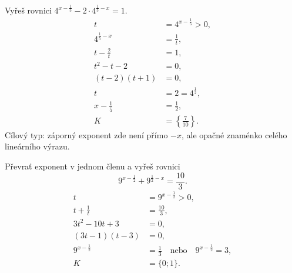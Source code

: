 \documentclass[11pt,a4paper]{article}
\begin{document}
\begin{prikladReseniBox}[title={Příklad 4}]
Vyřeš rovnici $4^{x-\frac{1}{5}}-2\cdot4^{\frac{1}{5}-x}=1$.
\tcblower
\[
\begin{aligned}t&=4^{x-\frac{1}{5}}>0,\\4^{\frac{1}{5}-x}&=\frac{1}{t},\\t-\frac{2}{t}&=1,\\t^2-t-2&=0,\\(t-2)(t+1)&=0,\\t&=2=4^{\frac{1}{2}},\\x-\frac{1}{5}&=\frac{1}{2},\\K&=\left\{\frac{7}{10}\right\}.\end{aligned}
\]
Cílový typ: záporný exponent zde není přímo $-x$, ale opačné znaménko celého lineárního výrazu.
\end{prikladReseniBox}
\begin{prikladReseniBox}[title={Příklad 5}]
Převrať exponent v jednom členu a vyřeš rovnici
\[
9^{x-\frac{1}{2}}+9^{\frac{1}{2}-x}=\frac{10}{3}.
\]
\tcblower
\[
\begin{aligned}
t&=9^{x-\frac{1}{2}}>0,\\t+\frac{1}{t}&=\frac{10}{3},\\3t^2-10t+3&=0,\\(3t-1)(t-3)&=0,\\9^{x-\frac{1}{2}}&=\frac{1}{3}\quad\text{nebo}\quad9^{x-\frac{1}{2}}=3,\\K&=\{0;1\}.
\end{aligned}
\]
\end{prikladReseniBox}
\end{document}
